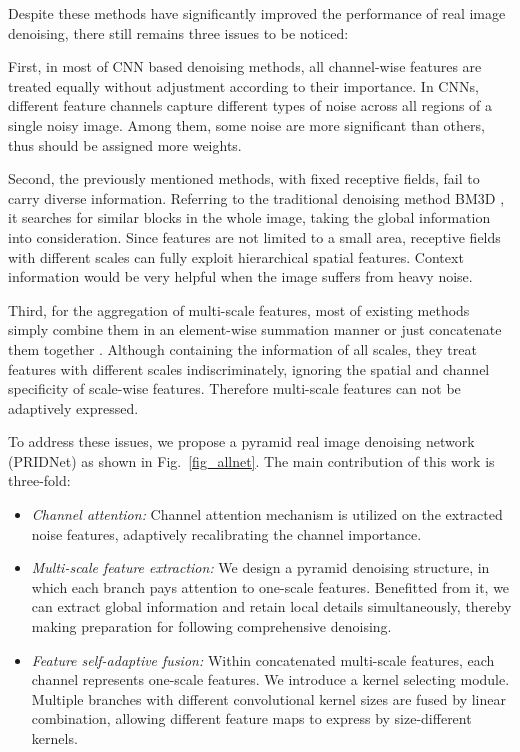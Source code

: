 \documentclass[conference]{IEEEtran}
\begin{document}
Despite these methods have significantly improved the performance of real image denoising, there still remains three issues to be noticed:


First, in most of CNN based denoising methods, all channel-wise features are treated equally without adjustment according to their importance. In CNNs, different feature channels capture different types of noise across all regions of a single noisy image. Among them, some noise are more significant than others, thus should be assigned more weights.

Second, the previously mentioned methods, with fixed receptive fields, fail to carry diverse information. Referring to the traditional denoising method BM3D \cite{BM3D}, it searches for similar blocks in the whole image, taking the global information into consideration. Since features are not limited to a small area, receptive fields with different scales can fully exploit hierarchical spatial features. Context information would be very helpful when the image suffers from heavy noise.

Third, for the aggregation of multi-scale features, most of existing methods simply combine them in an element-wise summation manner or just concatenate them together \cite{REDNet}. Although containing the information of all scales, they treat features with different scales indiscriminately, ignoring the spatial and channel specificity of scale-wise features. Therefore multi-scale features can not be adaptively expressed.

To address these issues, we propose a pyramid real image denoising network (PRIDNet) as shown in Fig.~\ref{fig_allnet}. The main contribution of this work is three-fold:
\begin{itemize}
\item \emph{Channel attention:} Channel attention mechanism is utilized on the extracted noise features, adaptively recalibrating the channel importance.
\item \emph{Multi-scale feature extraction:} We design a pyramid denoising structure, in which each branch pays attention to one-scale features. Benefitted from it, we can extract global information and retain local details simultaneously, thereby making preparation for following comprehensive denoising.

\item \emph{Feature self-adaptive fusion:} Within concatenated multi-scale features, each channel represents one-scale features. We introduce a kernel selecting module. Multiple branches with different convolutional kernel sizes are fused by linear combination, allowing different feature maps to express by size-different kernels.
\end{itemize}
\end{document}
